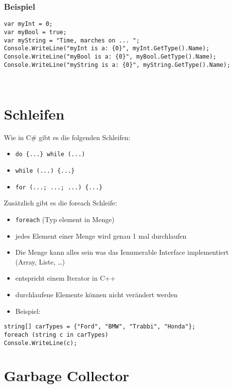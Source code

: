 \subsubsection*{Beispiel}
\begin{lstlisting}[language={[Sharp]C}]
var myInt = 0;
var myBool = true;
var myString = "Time, marches on ... ";
Console.WriteLine("myInt is a: {0}", myInt.GetType().Name);
Console.WriteLine("myBool is a: {0}", myBool.GetType().Name);
Console.WriteLine("myString is a: {0}", myString.GetType().Name);
\end{lstlisting}

~

\section{Schleifen}

Wie in C\# gibt es die folgenden Schleifen:
\begin{itemize}
\item \lstinline$do {...} while (...)$
\item \lstinline$while (...) {...}$
\item \lstinline$for (...; ...; ...) {...}$
\end{itemize}
Zusätzlich gibt es die foreach Schleife:
\begin{itemize}
\item \lstinline$foreach$ (Typ element in Menge)
\item jedes Element einer Menge wird genau 1 mal durchlaufen
\item Die Menge kann alles sein was das Ienumerable Interface implementiert (Array, Liste, …)
\item entspricht einem Iterator in C++
\item durchlaufene Elemente können nicht verändert werden
\item Beispiel:
\end{itemize}
\begin{lstlisting}[language={[Sharp]C}]
string[] carTypes = {"Ford", "BMW", "Trabbi", "Honda"};
foreach (string c in carTypes) 
Console.WriteLine(c);
\end{lstlisting}


\section{Garbage Collector}

